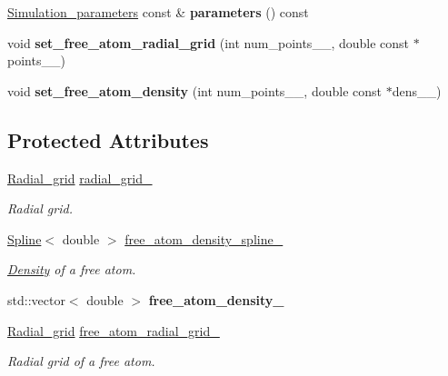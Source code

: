 \begin{DoxyCompactItemize}
\item 
\hypertarget{classsirius_1_1_atom__type_aa684bdaed74f0d4698f44aa079979115}{}\hyperlink{classsirius_1_1_simulation__parameters}{Simulation\+\_\+parameters} const \& {\bfseries parameters} () const \label{classsirius_1_1_atom__type_aa684bdaed74f0d4698f44aa079979115}

\item 
\hypertarget{classsirius_1_1_atom__type_a40ab16aab67047acbca4851782f1eca3}{}void {\bfseries set\+\_\+free\+\_\+atom\+\_\+radial\+\_\+grid} (int num\+\_\+points\+\_\+\+\_\+, double const $\ast$points\+\_\+\+\_\+)\label{classsirius_1_1_atom__type_a40ab16aab67047acbca4851782f1eca3}

\item 
\hypertarget{classsirius_1_1_atom__type_aae40678a580a96efd8dcfbe4e0066d8f}{}void {\bfseries set\+\_\+free\+\_\+atom\+\_\+density} (int num\+\_\+points\+\_\+\+\_\+, double const $\ast$dens\+\_\+\+\_\+)\label{classsirius_1_1_atom__type_aae40678a580a96efd8dcfbe4e0066d8f}

\end{DoxyCompactItemize}
\subsection*{Protected Attributes}
\begin{DoxyCompactItemize}
\item 
\hyperlink{classsirius_1_1_radial__grid}{Radial\+\_\+grid} \hyperlink{classsirius_1_1_atom__type_a84128b76a6e32374826af11fb270c0b1}{radial\+\_\+grid\+\_\+}
\begin{DoxyCompactList}\small\item\em Radial grid. \end{DoxyCompactList}\item 
\hyperlink{classsirius_1_1_spline}{Spline}$<$ double $>$ \hyperlink{classsirius_1_1_atom__type_a6eecfa70423000229cddd9af4726f6c1}{free\+\_\+atom\+\_\+density\+\_\+spline\+\_\+}
\begin{DoxyCompactList}\small\item\em \hyperlink{classsirius_1_1_density}{Density} of a free atom. \end{DoxyCompactList}\item 
\hypertarget{classsirius_1_1_atom__type_a2250950db5eb06e7534338f749ed1f96}{}std\+::vector$<$ double $>$ {\bfseries free\+\_\+atom\+\_\+density\+\_\+}\label{classsirius_1_1_atom__type_a2250950db5eb06e7534338f749ed1f96}

\item 
\hyperlink{classsirius_1_1_radial__grid}{Radial\+\_\+grid} \hyperlink{classsirius_1_1_atom__type_a63cd7fcff6f20ba748357553934009f0}{free\+\_\+atom\+\_\+radial\+\_\+grid\+\_\+}
\begin{DoxyCompactList}\small\item\em Radial grid of a free atom. \end{DoxyCompactList}\end{DoxyCompactItemize}
